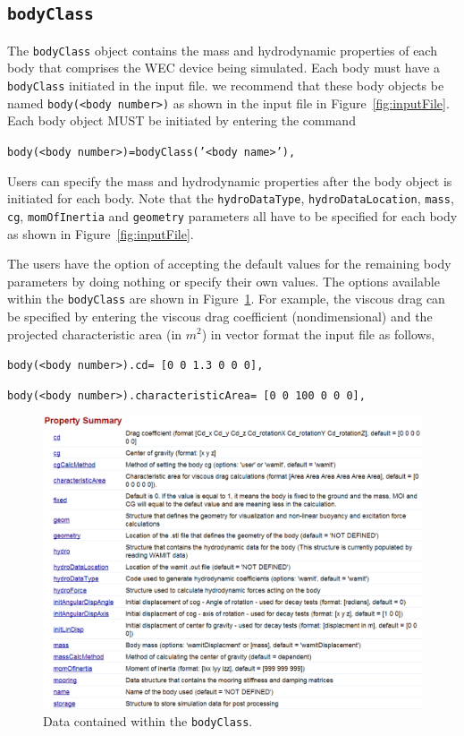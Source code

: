 \subsection{\texttt{bodyClass}}\label{subsec:bodyClass}

The \texttt{bodyClass} object contains the mass and hydrodynamic properties of each body that comprises the WEC device being simulated. Each body must have a \texttt{bodyClass} initiated in the input file. we recommend that these body objects be named \texttt{body(<body number>)} as shown in the input file in Figure~\ref{fig:inputFile}. Each body object MUST be initiated by entering the command

\begin{center}\texttt{\qquad{}body(<body number>)=bodyClass('<body name>'),}\end{center}

Users can specify the mass and hydrodynamic properties after the body object is initiated for each body. Note that the \texttt{hydroDataType}, \texttt{hydroDataLocation}, \texttt{mass}, \texttt{cg}, \texttt{momOfInertia} and \texttt{geometry} parameters all have to be specified for each body as shown in Figure~\ref{fig:inputFile}. 

The users have the option of accepting the default values for the remaining body parameters by doing nothing or specify their own values. The options available within the \texttt{bodyClass} are shown in Figure~\ref{fig:bodyClass}. For example, the viscous drag can be specified by entering the viscous drag coefficient (nondimensional) and the projected characteristic area (in ${m^2}$) in vector format the input file as follows,

\begin{center}\texttt{\qquad{}body(<body number>).cd= [0 0 1.3 0 0 0],}\end{center}
\begin{center}\texttt{\qquad{}body(<body number>).characteristicArea= [0 0 100 0 0 0],}\end{center}

\begin{figure}[H]
\centering
\includegraphics[width=1\textwidth]{codeStruct/images/bodyClass}
\caption{Data contained within the \texttt{bodyClass}.}
\label{fig:bodyClass}
\end{figure}
\clearpage
